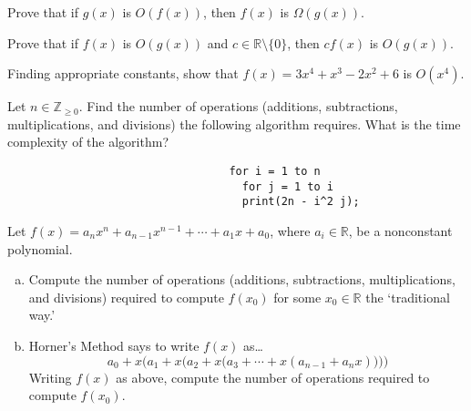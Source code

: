 \documentclass[11pt,letterpaper]{article}
\begin{document}
\homework{}

 Prove that if $g(x)$ is $O(f(x))$, then $f(x)$ is $\Omega(g(x))$. \pspace





\newpage





 Prove that if $f(x)$ is $O(g(x))$ and $c \in \mathbb{R} \setminus \{ 0 \}$, then $cf(x)$ is $O(g(x))$. \pspace





\newpage





 Finding appropriate constants, show that $f(x)= 3x^4 + x^3 - 2x^2 + 6$ is $O(x^4)$. \pspace





\newpage





 Let $n \in \mathbb{Z}_{\geq 0}$. Find the number of operations (additions, subtractions, multiplications, and divisions) the following algorithm requires. What is the time complexity of the algorithm?
	\begin{verbatim}
	                              for i = 1 to n
	                                for j = 1 to i
	                                print(2n - i^2 j); 
	\end{verbatim} \pspace





\newpage





 Let $f(x)= a_n x^n + a_{n-1} x^{n-1} + \cdots + a_1x + a_0$, where $a_i \in \mathbb{R}$, be a nonconstant polynomial. 
\begin{enumerate}[(a)]
\item Compute the number of operations (additions, subtractions, multiplications, and divisions) required to compute $f(x_0)$ for some $x_0 \in \mathbb{R}$ the `traditional way.' 
\item Horner's Method says to write $f(x)$ as\dots
	\[
	a_0 + x \bigg(a_1 + x \big( a_2 + x \big( a_3 + \cdots + x (a_{n-1} + a_n x ) \big) \big) \bigg) 
	\]
Writing $f(x)$ as above, compute the number of operations required to compute $f(x_0)$. 
\end{enumerate} \pspace
\end{document}

